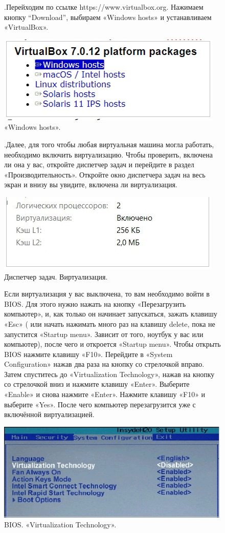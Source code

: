 
\begin{figure}
.\quad Перейходим по ссылке https://www.virtualbox.org. Нажимаем кнопку “Download”, выбираем «Windows hosts» и устанавливаем «VirtualBox».

		\centering
		\includegraphics[width=0.65\linewidth]{img/1.png}
\caption{«Windows hosts».}
\label{ris:image}
\end{figure}

\begin{figure}
.\quad Далее, для того чтобы любая виртуальная машина могла работать, необходимо включить виртуализацию. Чтобы проверить, включена ли она у вас, откройте диспетчер задач и перейдите в раздел «Производительность». Откройте окно диспетчера задач на весь экран и внизу вы увидите, включена ли виртуализация.

		\centering
		\includegraphics[width=0.65\linewidth]{img/2.png}
\caption{Диспетчер задач. Виртуализация.}
\label{ris:image}
\end{figure}

\begin{figure}
\quad Если виртуализация у вас выключена, то вам необходимо войти в BIOS. Для этого нужно нажать на кнопку «Перезагрузить компьютер», и, как только он начинает запускаться, зажать клавишу «Esc» ( или начать нажимать много раз на клавишу delete, пока не запустится «Startup menu». Зависит от того, ноутбук у вас или компьютер), после чего и откроется «Startup menu». Чтобы открыть BIOS нажмите клавишу «F10». Перейдите в «System Configuration» нажав два раза на кнопку со стрелочкой вправо. Затем спуститесь до «Virtualization Technology», нажав на кнопку со стрелочкой вниз и нажмите клавишу «Enter». Выберите «Enable» и снова нажмите «Enter». Нажмите клавишу «F10» и выберите «Yes». После чего компьютер перезагрузится уже с включённой виртуализацией.

		\centering
		\includegraphics[width=0.65\linewidth]{img/3.png}
\caption{BIOS. «Virtualization Technology».}
\label{ris:image}
\end{figure}

